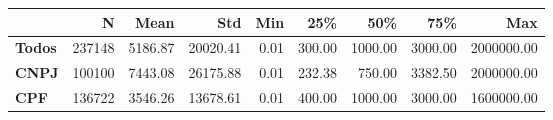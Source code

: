 \begin{tabular}{lrrrrrrrr}
\toprule
{} &      N &    Mean &      Std &  Min &    25\% &     50\% &     75\% &        Max \\
\midrule
\textbf{Todos} & 237148 & 5186.87 & 20020.41 & 0.01 & 300.00 & 1000.00 & 3000.00 & 2000000.00 \\
\textbf{CNPJ } & 100100 & 7443.08 & 26175.88 & 0.01 & 232.38 &  750.00 & 3382.50 & 2000000.00 \\
\textbf{CPF  } & 136722 & 3546.26 & 13678.61 & 0.01 & 400.00 & 1000.00 & 3000.00 & 1600000.00 \\
\bottomrule
\end{tabular}
